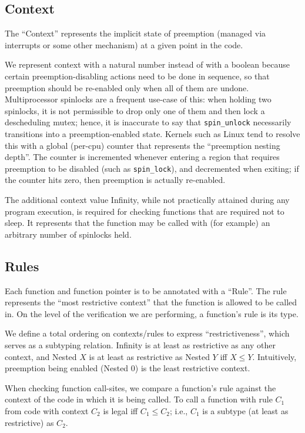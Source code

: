 \documentclass{article}
\begin{document}
\subsection{Context}

The ``Context'' represents the implicit state of preemption (managed via interrupts or some other mechanism) at a given point in the code.

We represent context with a natural number instead of with a boolean because certain preemption-disabling actions need to be done in sequence, so that preemption should be re-enabled only when all of them are undone.
Multiprocessor spinlocks are a frequent use-case of this: when holding two spinlocks, it is not permissible to drop only one of them and then lock a descheduling mutex; hence, it is inaccurate to say that \texttt{spin\_unlock} necessarily transitions into a preemption-enabled state.
Kernels such as Linux tend to resolve this with a global (per-cpu) counter that represents the ``preemption nesting depth''.
The counter is incremented whenever entering a region that requires preemption to be disabled (such as \texttt{spin\_lock}), and decremented when exiting; if the counter hits zero, then preemption is actually re-enabled.

The additional context value {\sf Infinity}, while not practically attained during any program execution, is required for checking functions that are required not to sleep. It represents that the function may be called with (for example) an arbitrary number of spinlocks held.

\subsection{Rules}

Each function and function pointer is to be annotated with a ``Rule''. The rule represents the ``most restrictive context'' that the function is allowed to be called in. On the level of the verification we are performing, a function's rule is its type.

We define a total ordering on contexts/rules to express ``restrictiveness'', which serves as a subtyping relation. {\sf Infinity} is at least as restrictive as any other context, and {\sf Nested $X$} is at least as restrictive as {\sf Nested $Y$} iff $X \le Y$. Intuitively, preemption being enabled ({\sf Nested $0$}) is the least restrictive context.

When checking function call-sites, we compare a function's rule against the context of the code in which it is being called. To call a function with rule $C_1$ from code with context $C_2$ is legal iff $C_1 \le C_2$; i.e., $C_1$ is a subtype (at least as restrictive) as $C_2$.
\end{document}

